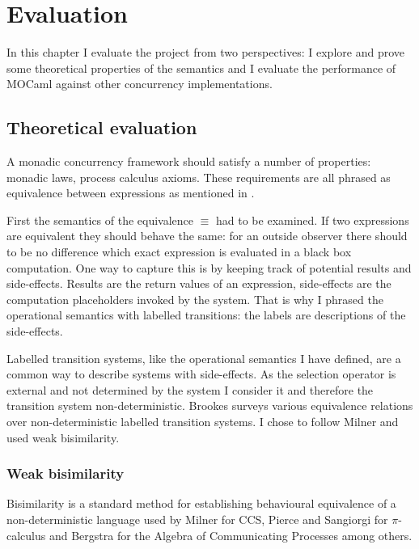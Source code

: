 \documentclass[12pt,twoside,notitlepage]{report}
\theoremstyle{plain}%
\theoremstyle{definition}
\theoremstyle{remark}
\begin{document}
\cleardoublepage
\chapter{Evaluation}
In this chapter I evaluate the project from two perspectives: I explore and prove some theoretical properties of the semantics and I evaluate the performance of MOCaml against other concurrency implementations.


\section{Theoretical evaluation}
\label{sec:behave_equiv}
A monadic concurrency framework should satisfy a number of properties: monadic laws, process calculus axioms. These requirements are all phrased as equivalence between expressions as mentioned in . 

First the semantics of the equivalence $ \equiv $ had to be examined. If two expressions are equivalent they should behave the same: for an outside observer there should to be no difference which exact expression is evaluated in a black box computation. One way to capture this is by keeping track of potential results and side-effects. Results are the return values of an expression, side-effects are the computation placeholders invoked by the system. That is why I phrased the operational semantics with labelled transitions: the labels are descriptions of the side-effects.

Labelled transition systems, like the operational semantics I have defined, are a common way to describe systems with side-effects. As the selection operator is external and not determined by the system I consider it and therefore the transition system non-deterministic. Brookes\cite{brookes1983behavioural} surveys various equivalence relations over non-deterministic labelled transition systems. I chose to follow Milner\cite{milner1982calculus} and used weak bisimilarity.

\subsection{Weak bisimilarity}
Bisimilarity is a standard method for establishing behavioural equivalence of a non-deterministic language used by Milner for CCS\cite{milner1982calculus}, Pierce and Sangiorgi for $ \pi $-calculus\cite{pierce2000behavioral} and Bergstra for the Algebra of Communicating Processes\cite{bergstra1986algebra,bergstra1985algebra} among others. 
\end{document}
